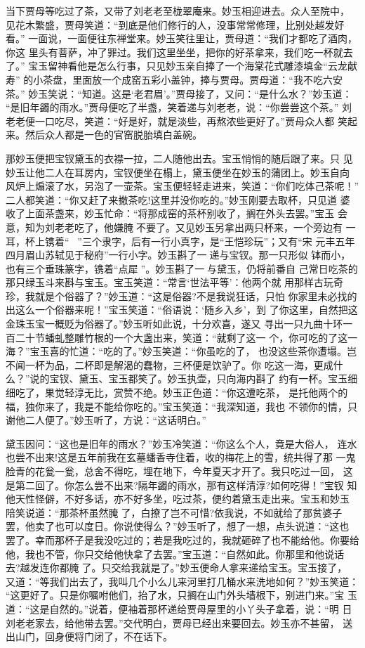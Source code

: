 当下贾母等吃过了茶，又带了刘老老至栊翠庵来。妙玉相迎进去。众人至院中，
见花木繁盛，贾母笑道：“到底是他们修行的人，没事常常修理，比别处越发好看。”
一面说，一面便往东禅堂来。妙玉笑往里让，贾母道：“我们才都吃了酒肉，你这
里头有菩萨，冲了罪过。我们这里坐坐，把你的好茶拿来，我们吃一杯就去了。”
宝玉留神看他是怎么行事，只见妙玉亲自捧了一个海棠花式雕漆填金“云龙献寿”
的小茶盘，里面放一个成窑五彩小盖钟，捧与贾母。贾母道：“我不吃六安茶。”
妙玉笑说：“知道。这是‘老君眉’。”贾母接了，又问：“是什么水？”妙玉道：
“是旧年蠲的雨水。”贾母便吃了半盏，笑着递与刘老老，说：“你尝尝这个茶。”
刘老老便一口吃尽，笑道：“好是好，就是淡些，再熬浓些更好了。”贾母众人都
笑起来。然后众人都是一色的官窑脱胎填白盖碗。

那妙玉便把宝钗黛玉的衣襟一拉，二人随他出去。宝玉悄悄的随后跟了来。只
见妙玉让他二人在耳房内，宝钗便坐在榻上，黛玉便坐在妙玉的蒲团上。妙玉自向
风炉上煽滚了水，另泡了一壶茶。宝玉便轻轻走进来，笑道：“你们吃体己茶呢！”
二人都笑道：“你又赶了来撤茶吃!这里并没你吃的。”妙玉刚要去取杯，只见道
婆收了上面茶盏来，妙玉忙命：“将那成窑的茶杯别收了，搁在外头去罢。”宝玉
会意，知为刘老老吃了，他嫌腌不要了。又见妙玉另拿出两只杯来，一个旁边有
一耳，杯上镌着“”三个隶字，后有一行小真字，是“王恺珍玩”；又有“宋
元丰五年四月眉山苏轼见于秘府”一行小字。妙玉斟了一递与宝钗。那一只形似
钵而小，也有三个垂珠篆字，镌着“点犀”。妙玉斟了一与黛玉，仍将前番自
己常日吃茶的那只绿玉斗来斟与宝玉。宝玉笑道：“常言‘世法平等’：他两个就
用那样古玩奇珍，我就是个俗器了？”妙玉道：“这是俗器?不是我说狂话，只怕
你家里未必找的出这么一个俗器来呢！”宝玉笑道：“俗语说：‘随乡入乡’，到
了你这里，自然把这金珠玉宝一概贬为俗器了。”妙玉听如此说，十分欢喜，遂又
寻出一只九曲十环一百二十节蟠虬整雕竹根的一个大盏出来，笑道：“就剩了这一
个，你可吃的了这一海？”宝玉喜的忙道：“吃的了。”妙玉笑道：“你虽吃的了，
也没这些茶你遭塌。岂不闻一杯为品，二杯即是解渴的蠢物，三杯便是饮驴了。你
吃这一海，更成什么？”说的宝钗、黛玉、宝玉都笑了。妙玉执壶，只向海内斟了
约有一杯。宝玉细细吃了，果觉轻淳无比，赏赞不绝。妙玉正色道：“你这遭吃茶，
是托他两个的福，独你来了，我是不能给你吃的。”宝玉笑道：“我深知道，我也
不领你的情，只谢他二人便了。”妙玉听了，方说：“这话明白。”

黛玉因问：“这也是旧年的雨水？”妙玉冷笑道：“你这么个人，竟是大俗人，
连水也尝不出来!这是五年前我在玄墓蟠香寺住着，收的梅花上的雪，统共得了那
一鬼脸青的花瓮一瓮，总舍不得吃，埋在地下，今年夏天才开了。我只吃过一回，
这是第二回了。你怎么尝不出来?隔年蠲的雨水，那有这样清淳?如何吃得！”宝钗
知他天性怪僻，不好多话，亦不好多坐，吃过茶，便约着黛玉走出来。宝玉和妙玉
陪笑说道：“那茶杯虽然腌了，白撩了岂不可惜?依我说，不如就给了那贫婆子
罢，他卖了也可以度日。你说使得么？”妙玉听了，想了一想，点头说道：“这也
罢了。幸而那杯子是我没吃过的；若是我吃过的，我就砸碎了也不能给他。你要给
他，我也不管，你只交给他快拿了去罢。”宝玉道：“自然如此。你那里和他说话
去?越发连你都腌了。只交给我就是了。”妙玉便命人拿来递给宝玉。宝玉接了，
又道：“等我们出去了，我叫几个小么儿来河里打几桶水来洗地如何？”妙玉笑道：
“这更好了。只是你嘱咐他们，抬了水，只搁在山门外头墙根下，别进门来。”宝
玉道：“这是自然的。”说着，便袖着那杯递给贾母屋里的小丫头子拿着，说：“明
日刘老老家去，给他带去罢。”交代明白，贾母已经出来要回去。妙玉亦不甚留，
送出山门，回身便将门闭了，不在话下。

